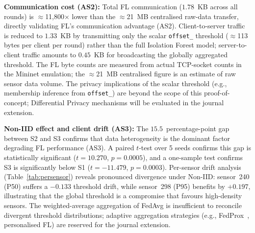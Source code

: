 \documentclass[conference]{IEEEtran}
\begin{document}
\textbf{Communication cost (AS2):}
Total FL communication ($1.78$~KB across all rounds) is
$\approx$11,800$\times$ lower than the $\approx$21~MB centralised
raw-data transfer, directly validating FL's communication advantage
(AS2).
Client-to-server traffic is reduced to $1.33$~KB by transmitting only
the scalar \texttt{offset\_} threshold ($\approx$113 bytes per client
per round) rather than the full Isolation Forest model;
server-to-client traffic amounts to $0.45$~KB for broadcasting the
globally aggregated threshold.
The FL byte counts are measured from actual TCP-socket counts in the
Mininet emulation; the $\approx$21~MB centralised figure is an estimate
of raw sensor data volume.
The privacy implications of the scalar threshold (e.g., membership
inference from \texttt{offset\_}) are beyond the scope of this
proof-of-concept; Differential Privacy mechanisms will be evaluated in
the journal extension.

\textbf{Non-IID effect and client drift (AS3):}
The $15.5$~percentage-point gap between S2 and S3 confirms that data
heterogeneity is the dominant factor degrading FL performance (AS3).
A paired $t$-test over 5 seeds confirms this gap is statistically
significant ($t=10.270$, $p=0.0005$), and a one-sample test confirms
S3 is significantly below S1 ($t=-11.479$, $p=0.0003$).
Per-sensor drift analysis (Table~\ref{tab:persensor}) reveals
pronounced divergence under Non-IID: sensor~240 (P50) suffers a
$-0.133$ threshold drift, while sensor~298 (P95) benefits by $+0.197$,
illustrating that the global threshold is a compromise that favours
high-density sensors.
The weighted-average aggregation of FedAvg is insufficient to reconcile
divergent threshold distributions; adaptive aggregation strategies
(e.g., FedProx~\cite{li2020fedprox},
personalised FL) are reserved
for the journal extension.
\end{document}
